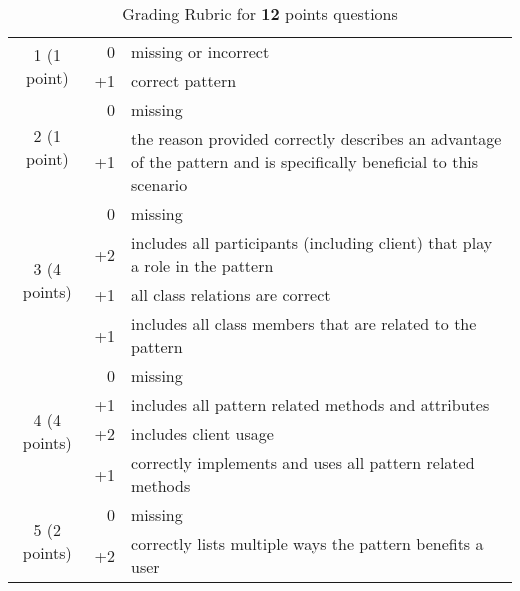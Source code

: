 \begin{table}[H]
	\caption{Grading Rubric for {\bf 12} points questions}
	\label{rubric12}
    \centering
    \begin{tabular}{|c|r|p{}|}
        \hline
	    \multirow{2}{*}{1 (1 point)} & 0 & missing or incorrect \\
	    \cline{2-3}
	    & +1 & correct pattern \\
        \hline
	    \multirow{2}{*}{2 (1 point)} & 0 & missing \\
	    \cline{2-3}
	    & +1 & the reason provided correctly describes an advantage of the pattern and is specifically beneficial to this scenario \\
        \hline
	    \multirow{4}{*}{3 (4 points)} & 0 & missing \\
	    \cline{2-3}
	    & +2 & includes all participants (including client) that play a role in the pattern \\
	    \cline{2-3}
	    & +1 & all class relations are correct \\
	    \cline{2-3}
	    & +1 & includes all class members that are related to the pattern \\
        \hline
	    \multirow{4}{*}{4 (4 points)} & 0 & missing \\
	    \cline{2-3}
	    & +1 & includes all pattern related methods and attributes \\
	    \cline{2-3}
	    & +2 & includes client usage \\
	    \cline{2-3}
	    & +1 & correctly implements and uses all pattern related methods \\
        \hline
	    \multirow{2}{*}{5 (2 points)} & 0 & missing \\
	    \cline{2-3}
	    & +2 & correctly lists multiple ways the pattern benefits a user \\
        \hline
    \end{tabular}
\end{table}
